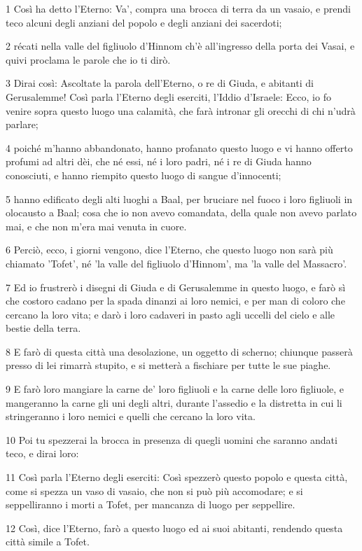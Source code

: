 \par 1 Così ha detto l'Eterno: Va', compra una brocca di terra da un vasaio, e prendi teco alcuni degli anziani del popolo e degli anziani dei sacerdoti;
\par 2 récati nella valle del figliuolo d'Hinnom ch'è all'ingresso della porta dei Vasai, e quivi proclama le parole che io ti dirò.
\par 3 Dirai così: Ascoltate la parola dell'Eterno, o re di Giuda, e abitanti di Gerusalemme! Così parla l'Eterno degli eserciti, l'Iddio d'Israele: Ecco, io fo venire sopra questo luogo una calamità, che farà intronar gli orecchi di chi n'udrà parlare;
\par 4 poiché m'hanno abbandonato, hanno profanato questo luogo e vi hanno offerto profumi ad altri dèi, che né essi, né i loro padri, né i re di Giuda hanno conosciuti, e hanno riempito questo luogo di sangue d'innocenti;
\par 5 hanno edificato degli alti luoghi a Baal, per bruciare nel fuoco i loro figliuoli in olocausto a Baal; cosa che io non avevo comandata, della quale non avevo parlato mai, e che non m'era mai venuta in cuore.
\par 6 Perciò, ecco, i giorni vengono, dice l'Eterno, che questo luogo non sarà più chiamato 'Tofet', né 'la valle del figliuolo d'Hinnom', ma 'la valle del Massacro'.
\par 7 Ed io frustrerò i disegni di Giuda e di Gerusalemme in questo luogo, e farò sì che costoro cadano per la spada dinanzi ai loro nemici, e per man di coloro che cercano la loro vita; e darò i loro cadaveri in pasto agli uccelli del cielo e alle bestie della terra.
\par 8 E farò di questa città una desolazione, un oggetto di scherno; chiunque passerà presso di lei rimarrà stupito, e si metterà a fischiare per tutte le sue piaghe.
\par 9 E farò loro mangiare la carne de' loro figliuoli e la carne delle loro figliuole, e mangeranno la carne gli uni degli altri, durante l'assedio e la distretta in cui li stringeranno i loro nemici e quelli che cercano la loro vita.
\par 10 Poi tu spezzerai la brocca in presenza di quegli uomini che saranno andati teco, e dirai loro:
\par 11 Così parla l'Eterno degli eserciti: Così spezzerò questo popolo e questa città, come si spezza un vaso di vasaio, che non si può più accomodare; e si seppelliranno i morti a Tofet, per mancanza di luogo per seppellire.
\par 12 Così, dice l'Eterno, farò a questo luogo ed ai suoi abitanti, rendendo questa città simile a Tofet.
